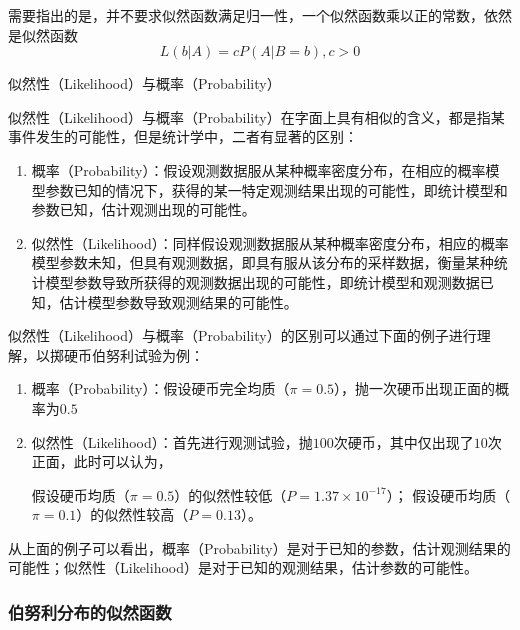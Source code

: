 需要指出的是，并不要求似然函数满足归一性，一个似然函数乘以正的常数，依然是似然函数
\begin{equation}
    L(b|A) = cP(A|B=b) , c > 0
\end{equation}

\begin{note}
    似然性（Likelihood）与概率（Probability）

    似然性（Likelihood）与概率（Probability）在字面上具有相似的含义，都是指某事件发生的可能性，但是统计学中，二者有显著的区别：

    \begin{enumerate}[itemsep=0pt,parsep=0pt]
        \item 概率（Probability）：假设观测数据服从某种概率密度分布，在相应的概率模型参数已知的情况下，获得的某一特定观测结果出现的可能性，即统计模型和参数已知，估计观测出现的可能性。
        \item 似然性（Likelihood）：同样假设观测数据服从某种概率密度分布，相应的概率模型参数未知，但具有观测数据，即具有服从该分布的采样数据，衡量某种统计模型参数导致所获得的观测数据出现的可能性，即统计模型和观测数据已知，估计模型参数导致观测结果的可能性。
    \end{enumerate}

    似然性（Likelihood）与概率（Probability）的区别可以通过下面的例子进行理解，以掷硬币伯努利试验为例：

    \begin{enumerate}[itemsep=0pt,parsep=0pt]
        \item 概率（Probability）：假设硬币完全均质（$\pi =0.5$），抛一次硬币出现正面的概率为$0.5$
        \item 似然性（Likelihood）：首先进行观测试验，抛$100$次硬币，其中仅出现了$10$次正面，此时可以认为，

              假设硬币均质（$\pi =0.5$）的似然性较低（$P=1.37\times 10^{-17}$）；
              假设硬币均质（$\pi =0.1$）的似然性较高（$P=0.13$）。


    \end{enumerate}

    从上面的例子可以看出，概率（Probability）是对于已知的参数，估计观测结果的可能性；似然性（Likelihood）是对于已知的观测结果，估计参数的可能性。
\end{note}

\subsubsection{伯努利分布的似然函数}

